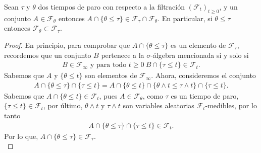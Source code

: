\begin{lemma}
	\label{sigmaparadasubset}
	Sean $\tau$ y $\theta$ dos tiempos de paro con respecto a la filtración $(\mathcal{F}_t)_{t \geq 0}$, y un conjunto $A \in \mathcal{F}_{\theta}$ entonces $A \cap \{\theta \leq \tau\} \in \mathcal{F}_{\tau} \cap \mathcal{F}_{\theta}$. En particular, si $\theta \leq \tau$ entonces $\mathcal{F}_{\theta} \subset \mathcal{F}_{\tau}$.
\end{lemma}
\begin{proof}
	En principio, para comprobar que $A \cap \{\theta \leq \tau\}$ es un elemento de $\mathcal{F}_{\tau}$, recordemos que un conjunto $B$ pertenece a la $\sigma$-álgebra mencionada si y solo si
	\begin{align*}
		B \in \mathcal{F}_{\infty} \text{  y para todo  } t \geq 0 \ B \cap \{\tau \leq t\} \in \mathcal{F}_t.
	\end{align*}
	Sabemos que $A$ y $\{\theta \leq t\}$ son elementos de $\mathcal{F}_{\infty}$. Ahora, consideremos el conjunto
	\begin{align*}
		A \cap \{ \theta \leq \tau\} \cap \{\tau \leq t\} = A \cap \{\theta \leq t\} \cap \{\theta \wedge t \leq \tau \wedge t\} \cap \{\tau \leq t\}.
	\end{align*}
	Sabemos que $A \cap \{\theta \leq t\} \in \mathcal{F}_t$, pues $A \in \mathcal{F}_{\theta}$, como $\tau$ es un tiempo de paro, $\{\tau \leq t\} \in \mathcal{F}_t$, por último, $\theta \wedge t$ y $\tau \wedge t$ son variables aleatorias $\mathcal{F}_t$-medibles, por lo tanto
	\begin{align*}
		A \cap \{ \theta \leq \tau\} \cap \{\tau \leq t\} \in \mathcal{F}_t.
	\end{align*}
	Por lo que, $A \cap \{\theta \leq \tau\} \in \mathcal{F}_{\tau}$. \\


\end{proof}
